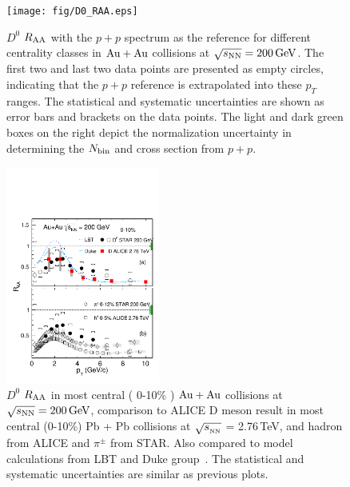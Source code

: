 \documentclass[%
 reprint,	
 amsmath,amssymb,
 aps,
 prc,
]{revtex4-1}
\begin{document}

\begin{figure}
\centering
\texttt{[image: fig/D0\_RAA.eps]}
\caption{$D^{0}$ $R_{\rm AA}$ with the $p + p$ spectrum as the reference for different centrality classes in ${\rm{Au + Au}}$ collisions at ${\sqrt{s_{\rm NN}} = \rm{200\,GeV}}$. The first two and last two data points are presented as empty circles, indicating that the $p + p$ reference is extrapolated into these $p_T$ ranges. The statistical and systematic uncertainties are shown as error bars and brackets on the data points. The light and dark green boxes on the right depict the normalization uncertainty in determining the $N_{\rm bin}$ and cross section from $p + p$.}
\label{fig:D0_RAA} 
\end{figure}

\begin{figure}
\centering
\includegraphics[width=0.45\textwidth]{fig/D0_RAA_LHC.pdf}
  \caption{$D^{0}$ $R_{\rm AA}$ in most central ( 0-10\% ) ${\rm{Au + Au}}$ collisions at ${\sqrt{s_{\rm NN}} = \rm{200\,GeV}}$, comparison to ALICE D meson result in most central (0-10\%) Pb + Pb collisions at $\sqrt{s_{_{\rm NN}}}$ = 2.76\,TeV, and hadron from ALICE and $\pi^{\pm}$ from STAR. Also compared to model calculations from LBT and Duke group~\cite{Cao:2016gvr,LBT:private}. The statistical and systematic uncertainties are similar as previous plots.}
\label{fig:D0_RAA_LHC} 
\end{figure}
\end{document}
